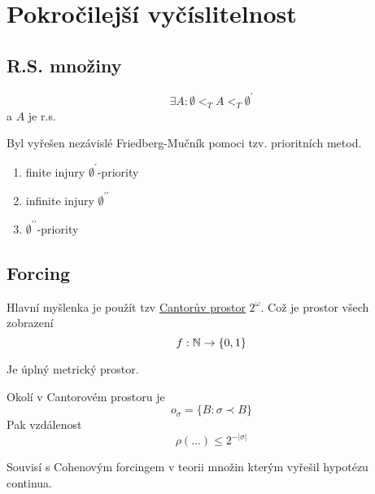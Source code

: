 \section{\texorpdfstring{Pokročilejší vyčíslitelnost}{Pokročilejší vyčíslitelnost}}
\vspace{5mm}
\large

\subsection{R.S. množiny}

\begin{definition}
	\[ \exists A: \emptyset <_T A <_T \emptyset^{\prime} \]
	a $A$ je r.s.

	Byl vyřešen nezávislé Friedberg-Mučník pomoci tzv. prioritních metod.
	\begin{enumerate}
		\item finite injury $\emptyset^{\prime}$-priority
		\item infinite injury $\emptyset^{\prime\prime}$
		\item $\emptyset^{\prime\prime}$-priority
	\end{enumerate}
\end{definition}

\subsection{Forcing}

\begin{definition}
	Hlavní myšlenka je použít tzv \href{https://en.wikipedia.org/wiki/Cantor_space}{Cantorův prostor} $2^{\omega}$.
	Což je prostor všech zobrazení
	\[ f:\operatorname{\mathbb{N}} \to \{ 0, 1 \} \]

	Je úplný metrický prostor.
\end{definition}

\begin{note}
	Okolí v Cantorovém prostoru je
	\[ o_{\sigma} = \{ B: \sigma \prec B \} \]
	Pak vzdálenost
	\[ \rho(\ldots) \leq 2^{-|\sigma|} \]
\end{note}

\begin{definition}
	Souvisí s Cohenovým forcingem v teorii množin kterým vyřešil hypotézu continua.
\end{definition}

